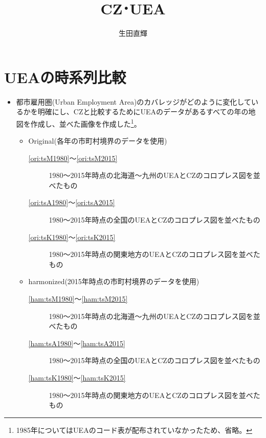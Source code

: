 \documentclass{ltjsarticle}
\title{CZ･UEA}
\author{生田直輝}
\begin{document}
\section{UEAの時系列比較}
\begin{itemize}
  \item 都市雇用圏(Urban Employment Area)のカバレッジがどのように変化しているかを明確にし、CZと比較するためにUEAのデータがあるすべての年の地図を作成し、並べた画像を作成した\footnote{1985年についてはUEAのコード表が配布されていなかったため、省略。}。
  \begin{itemize}
    \item Original(各年の市町村境界のデータを使用)
    \begin{description}
      \item[\ref{ori:tsM1980}～\ref{ori:tsM2015}] 1980～2015年時点の北海道～九州のUEAとCZのコロプレス図を並べたもの
      \item[\ref{ori:tsA1980}～\ref{ori:tsA2015}] 1980～2015年時点の全国のUEAとCZのコロプレス図を並べたもの
      \item[\ref{ori:tsK1980}～\ref{ori:tsK2015}] 1980～2015年時点の関東地方のUEAとCZのコロプレス図を並べたもの
    \end{description}

    \item harmonized(2015年時点の市町村境界のデータを使用)
    \begin{description}
      \item[\ref{ham:tsM1980}～\ref{ham:tsM2015}] 1980～2015年時点の北海道～九州のUEAとCZのコロプレス図を並べたもの
      \item[\ref{ham:tsA1980}～\ref{ham:tsA2015}] 1980～2015年時点の全国のUEAとCZのコロプレス図を並べたもの
      \item[\ref{ham:tsK1980}～\ref{ham:tsK2015}] 1980～2015年時点の関東地方のUEAとCZのコロプレス図を並べたもの
    \end{description}
  \end{itemize}
\end{itemize}

\end{document}
